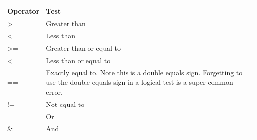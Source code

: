 \documentclass[
]{book}
\begin{document}
\begin{longtable}[]{@{}ll@{}}
\toprule
\begin{minipage}[b]{0.29\columnwidth}\raggedright
Operator\strut
\end{minipage} & \begin{minipage}[b]{0.65\columnwidth}\raggedright
Test\strut
\end{minipage}\tabularnewline
\midrule
\endhead
\begin{minipage}[t]{0.29\columnwidth}\raggedright
\textgreater{}\strut
\end{minipage} & \begin{minipage}[t]{0.65\columnwidth}\raggedright
Greater than\strut
\end{minipage}\tabularnewline
\begin{minipage}[t]{0.29\columnwidth}\raggedright
\textless{}\strut
\end{minipage} & \begin{minipage}[t]{0.65\columnwidth}\raggedright
Less than\strut
\end{minipage}\tabularnewline
\begin{minipage}[t]{0.29\columnwidth}\raggedright
\textgreater=\strut
\end{minipage} & \begin{minipage}[t]{0.65\columnwidth}\raggedright
Greater than or equal to\strut
\end{minipage}\tabularnewline
\begin{minipage}[t]{0.29\columnwidth}\raggedright
\textless=\strut
\end{minipage} & \begin{minipage}[t]{0.65\columnwidth}\raggedright
Less than or equal to\strut
\end{minipage}\tabularnewline
\begin{minipage}[t]{0.29\columnwidth}\raggedright
==\strut
\end{minipage} & \begin{minipage}[t]{0.65\columnwidth}\raggedright
Exactly equal to. Note this is a double equals sign. Forgetting to use the double equals sign in a logical test is a super-common error.\strut
\end{minipage}\tabularnewline
\begin{minipage}[t]{0.29\columnwidth}\raggedright
!=\strut
\end{minipage} & \begin{minipage}[t]{0.65\columnwidth}\raggedright
Not equal to\strut
\end{minipage}\tabularnewline
\begin{minipage}[t]{0.29\columnwidth}\raggedright
\textbar{}\strut
\end{minipage} & \begin{minipage}[t]{0.65\columnwidth}\raggedright
Or\strut
\end{minipage}\tabularnewline
\begin{minipage}[t]{0.29\columnwidth}\raggedright
\&\strut
\end{minipage} & \begin{minipage}[t]{0.65\columnwidth}\raggedright
And\strut
\end{minipage}\tabularnewline
\bottomrule
\end{longtable}
\end{document}
